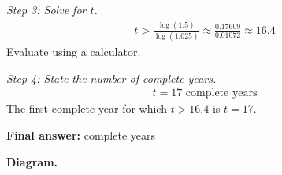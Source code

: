 \documentclass[11pt]{article}
\begin{document}
\textit{Step 3: Solve for \( t \).}
\[\begin{gathered}
t > \frac{\log(1.5)}{\log(1.025)} \approx \frac{0.17609}{0.01072} \approx 16.4
\end{gathered}\]
Evaluate using a calculator.

\textit{Step 4: State the number of complete years.}
\[\begin{gathered}
t = 17 \text{ complete years}
\end{gathered}\]
The first complete year for which \( t > 16.4 \) is \( t = 17 \).

\begin{answerbox}
\textbf{Final answer:} complete years
\end{answerbox}
\textbf{Diagram.}

\begin{center}
\end{center}
\end{document}
